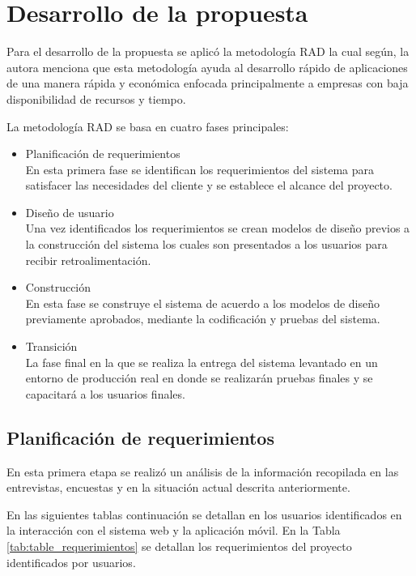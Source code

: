 \section{Desarrollo de la propuesta}\label{sec:desarrollo-propuesta}

Para el desarrollo de la propuesta se aplicó la metodología RAD la cual según\cite{bonilla_cadena_desarrollo_2022}, la autora menciona que esta metodología ayuda al desarrollo rápido de aplicaciones de una manera rápida y económica enfocada principalmente a empresas con baja disponibilidad de recursos y tiempo.

La metodología RAD se basa en cuatro fases principales:

\begin{itemize}
    \item Planificación de requerimientos \\
    En esta primera fase se identifican los requerimientos del sistema para satisfacer las necesidades del cliente y se establece el alcance del proyecto.
    \item Diseño de usuario\\
    Una vez identificados los requerimientos se crean modelos de diseño previos a la construcción del sistema los cuales son presentados a los usuarios para recibir retroalimentación.
    \item Construcción\\
    En esta fase se construye el sistema de acuerdo a los modelos de diseño previamente aprobados, mediante la codificación y pruebas del sistema.
    \item Transición \\
    La fase final en la que se realiza la entrega del sistema levantado en un entorno de producción real en donde se realizarán pruebas finales y se capacitará a los usuarios finales.
\end{itemize}

\subsection{Planificación de requerimientos} \label{subsec:planificacion-requerimientos}

En esta primera etapa se realizó un análisis de la información recopilada en las entrevistas, encuestas y en la situación actual descrita anteriormente.

En las siguientes tablas continuación se detallan en los usuarios identificados en la interacción con el sistema web y la aplicación móvil.
En la Tabla \ref{tab:table_requerimientos} se detallan los requerimientos del proyecto identificados por usuarios.

